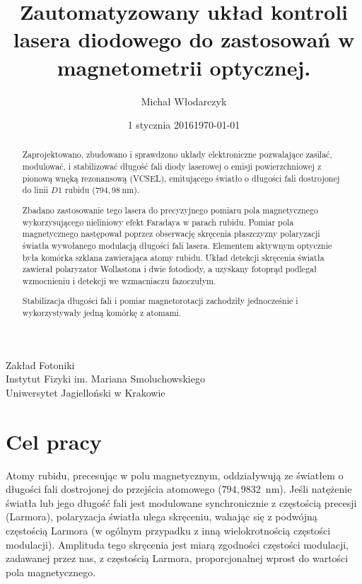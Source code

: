 \documentclass[a4paper,10pt]{article}
\date{1 stycznia 2016}
\title{Zautomatyzowany układ kontroli lasera diodowego do zastosowań w magnetometrii optycznej.}
\author{Michał Włodarczyk}
\date{\footnotesize{\today}}
\begin{document}



\maketitle
\vspace{0.25\textheight}
\begin{large}
\centering
Zakład Fotoniki\\
Instytut Fizyki im. Mariana Smoluchowskiego\\
Uniwersytet Jagielloński w Krakowie\\
\end{large}
\thispagestyle{empty}

\newpage
\tableofcontents
\thispagestyle{plain}
\setcounter{page}{1}
\newpage

\begin{abstract}
Zaprojektowano, zbudowano i sprawdzono układy elektroniczne pozwalające zasilać, modulować, i stabilizować długość fali diody laserowej o emisji powierzchniowej z pionową wnęką rezonansową (VCSEL), emitującego światło o długości fali dostrojonej do linii $D1$ rubidu ($794{,}98~ \mathrm{nm}$).

Zbadano zastosowanie tego lasera do precyzyjnego pomiaru pola magnetycznego wykorzysującego nieliniowy efekt Faradaya w parach rubidu. Pomiar pola magnetycznego następował poprzez obserwację skręcenia płaszczyzny polaryzacji światła wywołanego modulacją długości fali lasera. Elementem aktywnym optycznie była komórka szklana zawierająca atomy rubidu.  Układ detekcji skręcenia światła zawierał polaryzator Wollastona i dwie fotodiody, a uzyskany fotoprąd podlegał wzmocnieniu i detekcji we wzmacniaczu fazoczułym. 

Stabilizacja długości fali i pomiar magnetorotacji zachodziły jednocześnie i wykorzystywały jedną komórkę z atomami.
 
\end{abstract}

\section{Cel pracy}



Atomy rubidu, precesując w polu magnetycznym, oddziaływują ze światłem o długości fali dostrojonej do przejścia atomowego ($794{,}9832$~nm).
Jeśli natężenie światła lub jego długość fali jest modulowane synchronicznie z częstością precesji (Larmora), polaryzacja światła ulega skręceniu, wahając się z podwójną częstością Larmora (w ogólnym przypadku z inną wielokrotnością częstości modulacji).
Amplituda tego skręcenia jest miarą zgodności częstości modulacji, zadawanej przez nas, z częstością Larmora, proporcjonalnej wprost do wartości pola magnetycznego. 
\end{document}
